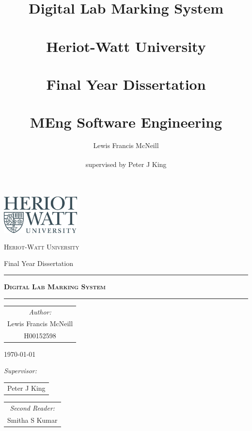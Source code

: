 \documentclass[11pt]{report}
\title{Digital Lab Marking System \\~\\  \large{Heriot-Watt University} \\~\\Final Year Dissertation \\~\\ MEng Software Engineering}
\author{Lewis Francis McNeill\\~\\
supervised by
Peter J King}
\begin{document}

\begin{titlepage}
\thispagestyle{empty}

{\centering
\includegraphics[width=0.3\textwidth]{images/hw-logo.jpg}\par\vspace{1cm}
{\scshape\LARGE Heriot-Watt University \par}
\vspace{1cm}
{\Large Final Year Dissertation\par}
\vspace{1cm}
\rule{\textwidth}{1pt}
{\scshape\huge\bfseries Digital Lab Marking System \par}
{\scshape\Large  \par}
\rule{\textwidth}{1pt}
\vspace{3cm}

\large{

\begin{tabular}{c}
\textit{Author:}\\
Lewis Francis McNeill\\ 
H00152598\\
\end{tabular}

\vspace{0.75cm}

\today

{\scshape\Large  \par}
\vspace{0.75cm}
\textit{Supervisor:}\par
\begin{tabular}{c}
Peter J King
\end{tabular}\par
\vspace{5mm}

\begin{tabular}{c}
\textit{Second Reader:}\\
Smitha S Kumar
\end{tabular}
}

}
\end{titlepage}
\end{document}
